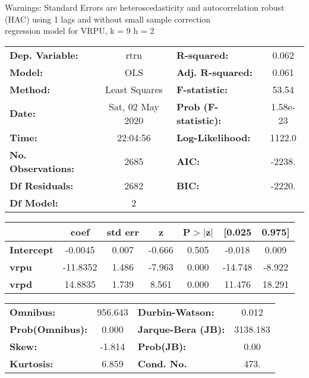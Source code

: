 Warnings: \newline
 [1] Standard Errors are heteroscedasticity and autocorrelation robust (HAC) using 1 lags and without small sample correction\\ 

regression model for VRPU, k = 9 h = 2\begin{center}
\begin{tabular}{lclc}
\toprule
\textbf{Dep. Variable:}    &       rtrn       & \textbf{  R-squared:         } &     0.062   \\
\textbf{Model:}            &       OLS        & \textbf{  Adj. R-squared:    } &     0.061   \\
\textbf{Method:}           &  Least Squares   & \textbf{  F-statistic:       } &     53.54   \\
\textbf{Date:}             & Sat, 02 May 2020 & \textbf{  Prob (F-statistic):} &  1.58e-23   \\
\textbf{Time:}             &     22:04:56     & \textbf{  Log-Likelihood:    } &    1122.0   \\
\textbf{No. Observations:} &        2685      & \textbf{  AIC:               } &    -2238.   \\
\textbf{Df Residuals:}     &        2682      & \textbf{  BIC:               } &    -2220.   \\
\textbf{Df Model:}         &           2      & \textbf{                     } &             \\
\bottomrule
\end{tabular}
\begin{tabular}{lcccccc}
                   & \textbf{coef} & \textbf{std err} & \textbf{z} & \textbf{P$> |$z$|$} & \textbf{[0.025} & \textbf{0.975]}  \\
\midrule
\textbf{Intercept} &      -0.0045  &        0.007     &    -0.666  &         0.505        &       -0.018    &        0.009     \\
\textbf{vrpu}      &     -11.8352  &        1.486     &    -7.963  &         0.000        &      -14.748    &       -8.922     \\
\textbf{vrpd}      &      14.8835  &        1.739     &     8.561  &         0.000        &       11.476    &       18.291     \\
\bottomrule
\end{tabular}
\begin{tabular}{lclc}
\textbf{Omnibus:}       & 956.643 & \textbf{  Durbin-Watson:     } &    0.012  \\
\textbf{Prob(Omnibus):} &   0.000 & \textbf{  Jarque-Bera (JB):  } & 3138.183  \\
\textbf{Skew:}          &  -1.814 & \textbf{  Prob(JB):          } &     0.00  \\
\textbf{Kurtosis:}      &   6.859 & \textbf{  Cond. No.          } &     473.  \\
\bottomrule
\end{tabular}
\end{center}


